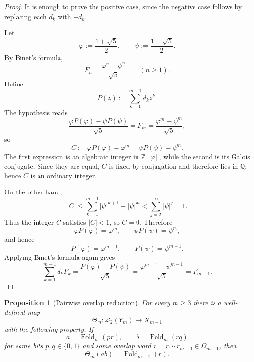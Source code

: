 \documentclass[11pt,letterpaper]{article}
\numberwithin{equation}{section}
\theoremstyle{plain}
\newtheorem{proposition}[theorem]{Proposition}
\theoremstyle{definition}
\theoremstyle{remark}
\newcommand{\ZZ}{\mathbb{Z}}
\DeclareMathOperator{\Fold}{Fold}
\begin{document}
\begin{proof}
It is enough to prove the positive case, since the negative case follows by
replacing each $d_k$ with $-d_k$.

Let
\[
\varphi:=\frac{1+\sqrt5}{2},
\qquad
\psi:=\frac{1-\sqrt5}{2}.
\]
By Binet's formula,
\[
F_n=\frac{\varphi^n-\psi^n}{\sqrt5}
\qquad (n\ge 1).
\]
Define
\[
P(z):=\sum_{k=1}^{m-1} d_kz^k.
\]
The hypothesis reads
\[
\frac{\varphi P(\varphi)-\psi P(\psi)}{\sqrt5}=F_m
=
\frac{\varphi^m-\psi^m}{\sqrt5},
\]
so
\[
C:=\varphi P(\varphi)-\varphi^m
=
\psi P(\psi)-\psi^m.
\]
The first expression is an algebraic integer in $\ZZ[\varphi]$, while the
second is its Galois conjugate.  Since they are equal, $C$ is fixed by
conjugation and therefore lies in $\mathbb{Q}$; hence $C$ is an ordinary
integer.

On the other hand,
\[
|C|
\le
\sum_{k=1}^{m-1} |\psi|^{k+1}+|\psi|^m
<
\sum_{j=2}^{\infty} |\psi|^j
=
1.
\]
Thus the integer $C$ satisfies $|C|<1$, so $C=0$.  Therefore
\[
\varphi P(\varphi)=\varphi^m,
\qquad
\psi P(\psi)=\psi^m,
\]
and hence
\[
P(\varphi)=\varphi^{m-1},
\qquad
P(\psi)=\psi^{m-1}.
\]
Applying Binet's formula again gives
\[
\sum_{k=1}^{m-1} d_kF_k
=
\frac{P(\varphi)-P(\psi)}{\sqrt5}
=
\frac{\varphi^{m-1}-\psi^{m-1}}{\sqrt5}
=
F_{m-1}.
\]
\end{proof}

\begin{proposition}[Pairwise overlap reduction]
\label{prop:pair-overlap-reduction}
For every $m\ge 3$ there is a well-defined map
\[
\Theta_m:\mathcal L_2(Y_m)\to X_{m-1}
\]
with the following property.  If
\[
a=\Fold_m(pr),
\qquad
b=\Fold_m(rq)
\]
for some bits $p,q\in\{0,1\}$ and some overlap word
$r=r_1\cdots r_{m-1}\in\Omega_{m-1}$, then
\[
\Theta_m(ab)=\Fold_{m-1}(r).
\]
\end{proposition}
\end{document}
